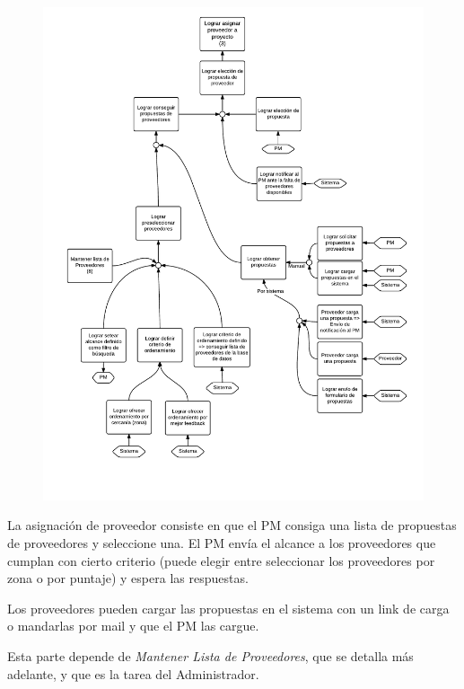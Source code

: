 \begin{figure}[H]
\includegraphics[width=\textwidth, clip=true, trim=15pt 50pt 15pt 0pt]{imagenes/objetivos/objetivos12.pdf}
\end{figure}

La asignación de proveedor consiste en que el PM consiga una lista de propuestas de proveedores y seleccione una.
El PM envía el alcance a los proveedores que cumplan con cierto criterio (puede elegir entre seleccionar los proveedores por zona o por puntaje) y espera las respuestas.

Los proveedores pueden cargar las propuestas en el sistema con un link de carga o mandarlas por mail y que el PM las cargue.

Esta parte depende de \textit{Mantener Lista de Proveedores}, que se detalla más adelante, y que es la tarea del Administrador.

